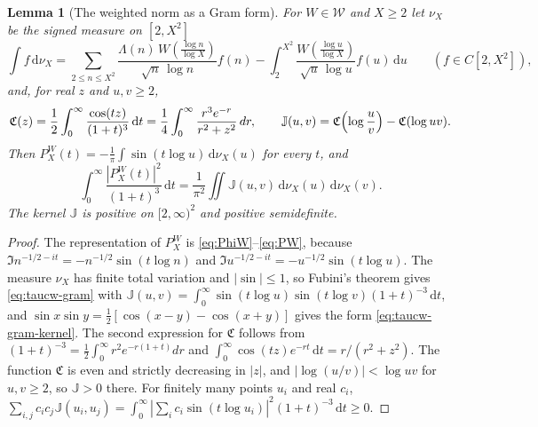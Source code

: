 \documentclass[11pt,a4paper]{article}
\numberwithin{equation}{section}
\newtheorem{lemma}[theorem]{Lemma}
\theoremstyle{definition}
\theoremstyle{remark}
\newcommand{\dd}{\,\mathrm dt}
\begin{document}
\begin{lemma}[The weighted norm as a Gram form]\label{lem:taucw-gram}
For $W\in\mathcal W$ and $X\ge2$ let $\nu_X$ be the signed measure on $[2,X^2]$
\begin{equation}\label{eq:taucw-nu}
\int f\,\mathrm d\nu_X=\sum_{2\le n\le X^2}\frac{\Lambda(n)\,W(\frac{\log n}{\log X})}{\sqrt n\,\log n}f(n)-\int_2^{X^2}\frac{W(\frac{\log u}{\log X})}{\sqrt u\,\log u}f(u)\,\mathrm du\qquad(f\in C[2,X^2]),
\end{equation}
and, for real $z$ and $u,v\ge2$,
\begin{equation}\label{eq:taucw-gram-kernel}
\mathfrak C(z)=\frac12\int_0^\infty\frac{\cos(tz)}{(1+t)^3}\dd=\frac14\int_0^\infty\frac{r^3e^{-r}}{r^2+z^2}\,dr,\qquad
\mathbb J(u,v)=\mathfrak C\Bigl(\log\frac uv\Bigr)-\mathfrak C(\log uv).
\end{equation}
Then $P^W_X(t)=-\frac1\pi\int\sin(t\log u)\,\mathrm d\nu_X(u)$ for every $t$, and
\begin{equation}\label{eq:taucw-gram}
\int_0^\infty\frac{|P^W_X(t)|^2}{(1+t)^3}\dd=\frac1{\pi^2}\iint\mathbb J(u,v)\,\mathrm d\nu_X(u)\,\mathrm d\nu_X(v).
\end{equation}
The kernel $\mathbb J$ is positive on $[2,\infty)^2$ and positive semidefinite.
\end{lemma}
\begin{proof}
The representation of $P^W_X$ is \eqref{eq:PhiW}--\eqref{eq:PW}, because $\Im n^{-1/2-it}=-n^{-1/2}\sin(t\log n)$ and $\Im u^{-1/2-it}=-u^{-1/2}\sin(t\log u)$. The measure $\nu_X$ has finite total variation and $|\sin|\le1$, so Fubini's theorem gives \eqref{eq:taucw-gram} with $\mathbb J(u,v)=\int_0^\infty\sin(t\log u)\sin(t\log v)(1+t)^{-3}\dd$, and $\sin x\sin y=\frac12[\cos(x-y)-\cos(x+y)]$ gives the form \eqref{eq:taucw-gram-kernel}. The second expression for $\mathfrak C$ follows from $(1+t)^{-3}=\frac12\int_0^\infty r^2e^{-r(1+t)}dr$ and $\int_0^\infty\cos(tz)e^{-rt}\dd=r/(r^2+z^2)$. The function $\mathfrak C$ is even and strictly decreasing in $|z|$, and $|\log(u/v)|<\log uv$ for $u,v\ge2$, so $\mathbb J>0$ there. For finitely many points $u_i$ and real $c_i$, $\sum_{i,j}c_ic_j\mathbb J(u_i,u_j)=\int_0^\infty|\sum_ic_i\sin(t\log u_i)|^2(1+t)^{-3}\dd\ge0$.
\end{proof}
\end{document}
